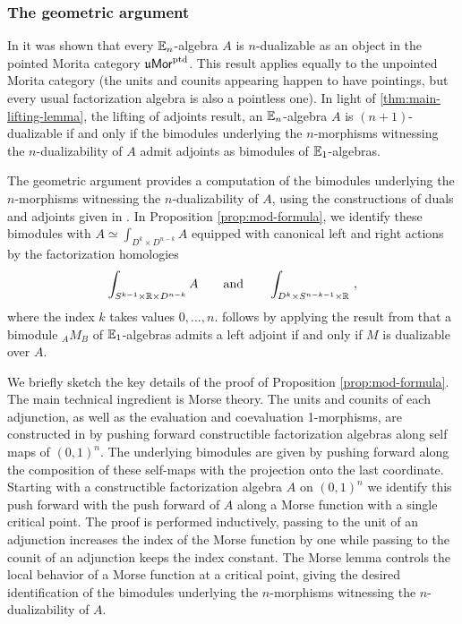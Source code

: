 \documentclass[10pt, reqno, twoside
, final
]{amsart}
\numberwithin{equation}{subsection}%
\theoremstyle{definition}
\theoremstyle{definition}
\theoremstyle{definition}
\theoremstyle{definition}
\theoremstyle{definition}
\theoremstyle{definition}
\theoremstyle{definition}
\theoremstyle{definition}
\theoremstyle{definition}
\theoremstyle{plain}
\theoremstyle{definition}
\theoremstyle{plain}
\theoremstyle{definition}
\theoremstyle{plain}
\theoremstyle{definition}
\theoremstyle{definition}
\theoremstyle{plain}
\theoremstyle{plain}
\theoremstyle{definition}
\theoremstyle{plain}
\theoremstyle{plain}
\theoremstyle{plain}
\begin{document}
\subsubsection{The geometric argument} In \cite{GS} it was shown that every $\mathbb{E}_n$-algebra $A$ is $n$-dualizable as an object in the pointed Morita category $\mathfrak{u}\mathsf{Mor}^{\mathrm{ptd}}$. This result applies equally to the unpointed Morita category (the units and counits appearing happen to have pointings, but every usual factorization algebra is also a pointless one). In light of \cref{thm:main-lifting-lemma}, the lifting of adjoints result, an $\mathbb{E}_n$-algebra $A$ is $(n+1)$-dualizable if and only if the bimodules underlying the $n$-morphisms witnessing the $n$-dualizability of $A$ admit adjoints as bimodules of $\mathbb{E}_1$-algebras.

The geometric argument provides a computation of the bimodules underlying the $n$-morphisms witnessing the $n$-dualizability of $A$, using the constructions of duals and adjoints given in \cite{GS}. In Proposition \ref{prop:mod-formula}, we identify these bimodules with $A \simeq \int_{D^k\times D^{n-k}} A$ equipped with canonical left and right actions by the factorization homologies
\begin{equation*}
    \int_{S^{k-1} \times \mathbb{R} \times D^{n-k}} A \qquad \text{and}\qquad \int_{D^{k} \times S^{n-k-1} \times \mathbb{R}} \ ,
\end{equation*}
where the index $k$ takes values $0,...,n$.  follows by applying the result from \cite[Proposition 4.6.2.13]{LurHA} that a bimodule ${}_{A}M_B$ of $\mathbb{E}_1$-algebras admits a left adjoint if and only if $M$ is dualizable over $A$.

We briefly sketch the key details of the proof of Proposition \ref{prop:mod-formula}. The main technical ingredient is Morse theory. The units and counits of each adjunction, as well as the evaluation and coevaluation 1-morphisms, are constructed in \cite{GS} by pushing forward constructible factorization algebras along self maps of $(0,1)^n$. The underlying bimodules are given by pushing forward along the composition of these self-maps with the projection onto the last coordinate. Starting with a constructible factorization algebra $A$ on $(0,1)^n$ we identify this push forward with the push forward of $A$ along a Morse function with a single critical point. The proof is performed inductively, passing to the unit of an adjunction increases the index of the Morse function by one while passing to the counit of an adjunction keeps the index constant. The Morse lemma controls the local behavior of a Morse function at a critical point, giving the desired identification of the bimodules underlying the $n$-morphisms witnessing the $n$-dualizability of $A$.
\end{document}
